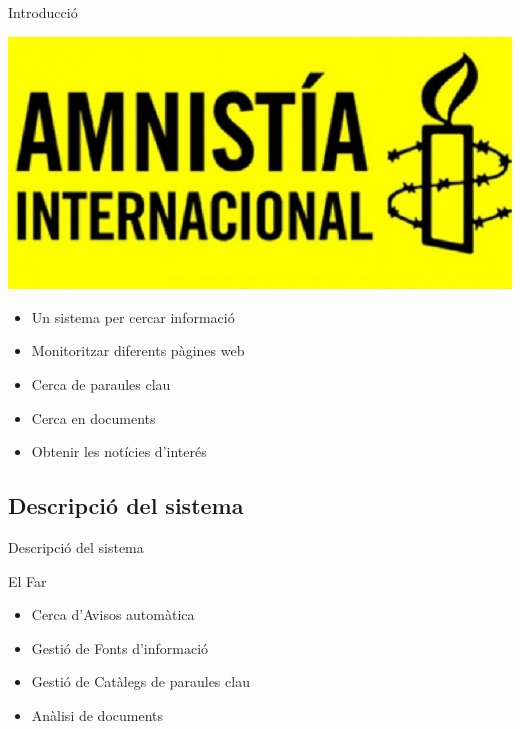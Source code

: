 \documentclass{beamer}
\begin{document}
\begin{frame}{Introducció}

    \includegraphics[height=0.2\textheight]{amnesty.jpg}

  \begin{itemize}
    \item Un sistema per cercar informació
    \pause{}%
  
    \item Monitoritzar diferents pàgines web
    \pause{}
  
    \item Cerca de paraules clau
    \pause{}
  
    \item Cerca en documents
    \pause{}
  
    \item Obtenir les notícies d'interés
  \end{itemize}
\end{frame}

\subsection{Descripció del sistema}

\begin{frame}{Descripció del sistema}
    \begin{block}{El Far}
        \begin{itemize}
            \item Cerca d'Avisos automàtica
            \item Gestió de Fonts d'informació
            \item Gestió de Catàlegs de paraules clau
            \item Anàlisi de documents
        \end{itemize}
    \end{block}
\end{frame}
\end{document}
